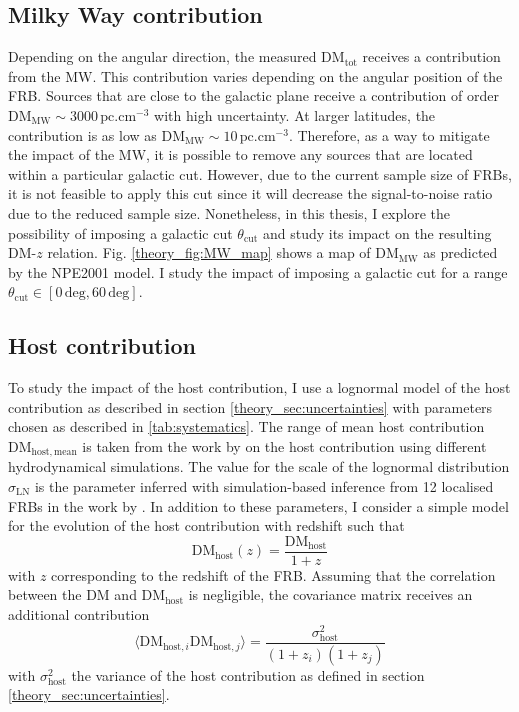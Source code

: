 \subsection{Milky Way contribution}
Depending on the angular direction, the measured $\mathrm{DM}_\mathrm{tot}$ receives a contribution from the MW. This contribution varies depending on the angular position of the FRB. Sources that are close to the galactic plane receive a contribution of order $\mathrm{DM}_\mathrm{MW} \sim 3000 \, \mathrm{pc}.\mathrm{cm}^{-3}$ with high uncertainty. At larger latitudes, the contribution is as low as $\mathrm{DM}_\mathrm{MW} \sim 10 \, \mathrm{pc}.\mathrm{cm}^{-3}$. Therefore, as a way to mitigate the impact of the MW, it is possible to remove any sources that are located within a particular galactic cut. However, due to the current sample size of FRBs, it is not feasible to apply this cut since it will decrease the signal-to-noise ratio due to the reduced sample size. Nonetheless, in this thesis, I explore the possibility of imposing a galactic cut $\theta_\mathrm{cut}$ and study its impact on the resulting DM-$z$ relation. Fig. \ref{theory_fig:MW_map} shows a map of $\mathrm{DM}_\mathrm{MW}$ as predicted by the NPE2001 model. I study the impact of imposing a galactic cut for a range $\theta_\mathrm{cut} \in [0\,\mathrm{deg}, 60\,\mathrm{deg}]$.




\subsection{Host contribution}
To study the impact of the host contribution, I use a lognormal model of the host contribution as described in section \ref{theory_sec:uncertainties} with parameters chosen as described in \ref{tab:systematics}. The range of mean host contribution $\mathrm{DM}_\mathrm{host, mean}$ is taken from the work by \citet{theis2024galaxy} on the host contribution using different hydrodynamical simulations. The value for the scale of the lognormal distribution $\sigma_\mathrm{LN}$ is the parameter inferred with simulation-based inference from 12 localised FRBs in the work by \citet{Konar_Reischke_Hagstotz_Nicola_Hildebrandt_2025a}.
In addition to these parameters, I consider a simple model for the evolution of the host contribution with redshift such that
\begin{equation}\label{eq:dm_host}
    \mathrm{DM}_\mathrm{host}(z) = \frac{\mathrm{DM}_\mathrm{host}}{1 + z}
\end{equation}
with $z$ corresponding to the redshift of the FRB. Assuming that the correlation between the $\mathrm{DM}$ and $\mathrm{DM}_\mathrm{host}$ is negligible, the covariance matrix receives an additional contribution
\begin{equation}\label{eq:dm_host_cov}
    \langle \mathrm{DM}_{\mathrm{host}, i} \mathrm{DM}_{\mathrm{host}, j}\rangle =  \frac{\sigma^2_\mathrm{host}}{(1 + z_i)(1+ z_j)}
\end{equation}
with $\sigma^2_\mathrm{host}$ the variance of the host contribution as defined in section \ref{theory_sec:uncertainties}.



